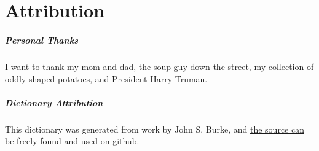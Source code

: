 \documentclass[main.tex]{subfiles}
\begin{document}
  \chapter{Attribution}

  \paragraph{Personal Thanks} I want to thank my mom and dad, the soup guy down the street, my collection of oddly shaped potatoes, and President Harry Truman.

  \paragraph{Dictionary Attribution} This dictionary was generated from work by John S. Burke, and \href{https://github.com/jsburke/conlang-dictionary}{the source can be freely found and used on github.}
\end{document}
